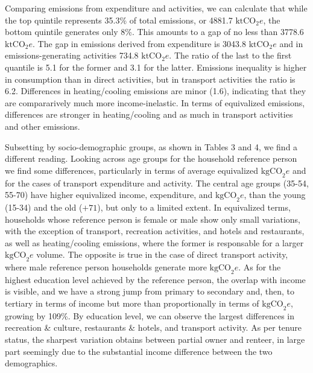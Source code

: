 \documentclass[
  10pt,
  twocolumn]{aft}
\begin{document}
Comparing emissions from expenditure and activities, we can calculate
that while the top quintile represents 35.3\% of total emissions, or
4881.7 \(\text{ktCO}_2e\), the bottom quintile generates only 8\%. This
amounts to a gap of no less than 3778.6 \(\text{ktCO}_2e\). The gap in
emissions derived from expenditure is 3043.8 \(\text{ktCO}_2e\) and in
emissions-generating activities 734.8 \(\text{ktCO}_2e\). The ratio of
the last to the first quantile is 5.1 for the former and 3.1 for the
latter. Emissions inequality is higher in consumption than in direct
activities, but in transport activities the ratio is 6.2. Differences in
heating/cooling emissions are minor (1.6), indicating that they are
compararively much more income-inelastic. In terms of equivalized
emissions, differences are stronger in heating/cooling and as much in
transport activities and other emissions.

Subsetting by socio-demographic groups, as shown in Tables 3 and 4, we
find a different reading. Looking across age groups for the household
reference person we find some differences, particularly in terms of
average equivalized \(\text{kgCO}_2e\) and for the cases of transport
expenditure and activity. The central age groups (35-54, 55-70) have
higher equivalized income, expenditure, and \(\text{kgCO}_2e\), than the
young (15-34) and the old (\(+71\)), but only to a limited extent. In
equivalized terms, households whose reference person is female or male
show only small variations, with the exception of transport, recreation
activities, and hotels and restaurants, as well as heating/cooling
emissions, where the former is responsable for a larger
\(\text{kgCO}_2e\) volume. The opposite is true in the case of direct
transport activity, where male reference person households generate more
\(\text{kgCO}_2e\). As for the highest education level achieved by the
reference person, the overlap with income is visible, and we have a
strong jump from primary to secondary and, then, to tertiary in terms of
income but more than proportionally in terms of \(\text{kgCO}_2e\),
growing by 109\%. By education level, we can observe the largest
differences in recreation \& culture, restaurants \& hotels, and
transport activity. As per tenure status, the sharpest variation obtains
between partial owner and renteer, in large part seemingly due to the
substantial income difference between the two demographics.
\end{document}
